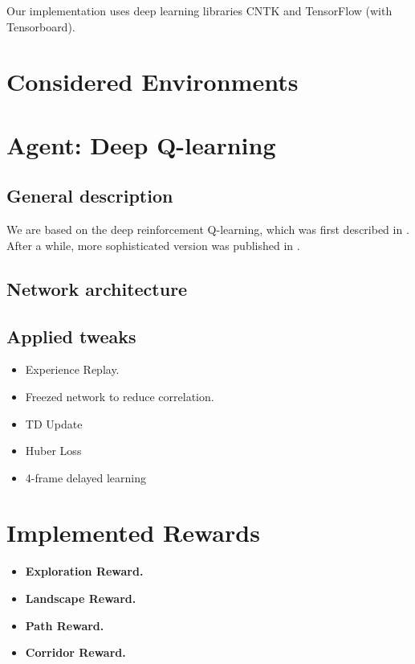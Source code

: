 \documentclass{article}
\begin{document}
Our implementation uses deep learning libraries CNTK and TensorFlow (with Tensorboard).

\section{Considered Environments}

\section{Agent: Deep Q-learning}

\subsection{General description} We are based on the deep reinforcement
Q-learning, which was first described in \cite{mnih2013playing}.
After a while, more sophisticated version was published in 
\cite{mnih2015humanlevel}.

\subsection{Network architecture}

\subsection{Applied tweaks}

\begin{itemize}
    \item Experience Replay.
    \item Freezed network to reduce correlation.
    \item TD Update 
    \item Huber Loss
    \item 4-frame delayed learning
\end{itemize}

\section{Implemented Rewards}

\begin{itemize}
    \item {\bf Exploration Reward.}
    \item {\bf Landscape Reward.}
    \item {\bf Path Reward.}
    \item {\bf Corridor Reward.}
\end{itemize}
\end{document}
